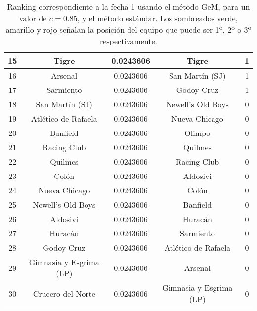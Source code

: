 \begin{table}[H]
\begin{flushright}
\begin{tabular}{| c | c | c || c | c |}
		15 & \cellcolor{yellow!20}Tigre & 0.0243606 & \cellcolor{yellow!20}Tigre & 1 \\ \hline
		16 & \cellcolor{yellow!20}Arsenal & 0.0243606 & \cellcolor{yellow!20}San Martín (SJ) & 1 \\ \hline
		17 & \cellcolor{yellow!20}Sarmiento & 0.0243606 & \cellcolor{yellow!20}Godoy Cruz & 1 \\ \hline
		18 & \cellcolor{yellow!20}San Martín (SJ) & 0.0243606 & \cellcolor{red!20}Newell's Old Boys & 0 \\ \hline
		19 & \cellcolor{yellow!20}Atlético de Rafaela & 0.0243606 & \cellcolor{red!20}Nueva Chicago & 0 \\ \hline
		20 & \cellcolor{yellow!20}Banfield & 0.0243606 & \cellcolor{red!20}Olimpo & 0 \\ \hline
		21 & \cellcolor{yellow!20}Racing Club & 0.0243606 &\cellcolor{red!20} Quilmes & 0 \\ \hline
		22 & \cellcolor{yellow!20}Quilmes & 0.0243606 &\cellcolor{red!20} Racing Club & 0 \\ \hline
		23 & \cellcolor{yellow!20}Colón & 0.0243606 & \cellcolor{red!20}Aldosivi & 0 \\ \hline
		24 & \cellcolor{yellow!20}Nueva Chicago & 0.0243606 & \cellcolor{red!20}Colón & 0 \\ \hline
		25 & \cellcolor{yellow!20}Newell's Old Boys & 0.0243606 & \cellcolor{red!20}Banfield & 0 \\ \hline
		26 & \cellcolor{yellow!20}Aldosivi & 0.0243606 & \cellcolor{red!20}Huracán & 0 \\ \hline
		27 & \cellcolor{yellow!20}Huracán & 0.0243606 & \cellcolor{red!20}Sarmiento & 0 \\ \hline
		28 & \cellcolor{yellow!20}Godoy Cruz & 0.0243606 & \cellcolor{red!20}Atlético de Rafaela & 0 \\ \hline
		29 & \cellcolor{yellow!20}Gimnasia y Esgrima (LP) & 0.0243606  & \cellcolor{red!20}Arsenal & 0 \\ \hline
		30 & \cellcolor{yellow!20}Crucero del Norte & 0.0243606 &\cellcolor{red!20} Gimnasia y Esgrima (LP) & 0 \\ \hline
	\end{tabular}
	\end{flushright}
	\caption{\footnotesize Ranking correspondiente a la fecha 1 usando el método GeM, para un valor de  $c = 0.85$, y el método estándar. Los sombreados verde, amarillo y rojo señalan la posición del equipo que puede ser 1º, 2º o 3º respectivamente.}
	\label{tab:fecha1}
\end{table}

